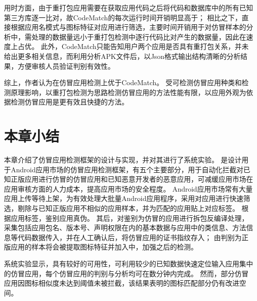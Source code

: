 用时方面，由于重打包应用需要在获取应用代码之后将代码和数据库中的所有已知第三方库逐一比对，故CodeMatch的每次运行时间开销明显高于\mytool ；
相比之下，\mytool 直接根据应用名模式与图标特征对应用进行筛选，主要时间开销用于对仿冒样本的分析中，需处理的数据量远小于重打包检测中逐行代码比对产生的数据量，因此在速度上占优。
此外，CodeMatch只能告知用户两个应用是否具有重打包关系，并未给出更多相关信息，而\mytool 利用\componentC 分析APK文件后，以Json格式输出结构清晰的分析结果，方便审核人员验证判别有效性。

综上，作者认为\mytool 在仿冒应用检测上优于CodeMatch。
受可检测仿冒应用种类和检测原理影响，以重打包检测为思路检测仿冒应用的方法性能有限，以应用外观为依据检测仿冒应用是更有效且快捷的方法。

\section{本章小结}

本章介绍了仿冒应用检测框架\mytool 的设计与实现，并对其进行了系统实验。
\mytool 是设计用于Android应用市场的仿冒应用检测框架，有五个主要部分，用于自动化拦截对已知正版应用进行仿冒的仿冒应用和已知恶意开发者的恶意应用，可减缓应用市场在应用审核方面的人力成本，提高应用市场的安全程度。
Android应用市场常有大量应用上传等待上架，为有效处理大批量Android应用程序，\mytool 采用\componentA 对应用进行快速筛选，剔除与已知正版应用不相似的应用样本，并为匹配的应用贴上对应标签。
\componentB 根据应用标签，鉴别应用真伪。
其后，\componentC 对\componentB 鉴别为仿冒的应用进行拆包反编译处理，采集包括应用包名、版本号、声明权限在内的基本数据与应用中的类信息、方法信息等代码数据传入\componentD ，并在人工确认后，将仿冒应用的证书指纹存入\componentE ；
由\componentB 判别为正版应用的样本将会被提取图标特征并加入\componentE 中，加强之后的检测。

系统实验显示，\mytool 具有较好的可用性，可利用较少的已知数据快速定位输入应用集中的仿冒应用，每个仿冒应用的判别与分析均可在数分钟内完成。
然而，部分仿冒应用因图标相似度未达到阈值未被\mytool 拦截，该结果表明\mytool 的图标匹配部分仍有改进空间。
